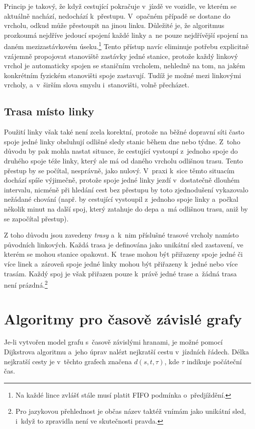 Princip je takový, že když cestující pokračuje v~jízdě ve vozidle, ve kterém se aktuálně nachází, nedochází k~přestupu. V~opačném případě se dostane do  vrcholu, odkud může přestoupit na jinou linku. Důležité je, že algoritmus prozkoumá nejdříve jedoucí spojení každé linky a~ne pouze nejdřívější spojení na daném mezizastávkovém úseku.\footnote{Na každé lince zvlášť stále musí platit FIFO podmínka o~předjíždění.} Tento přístup navíc eliminuje potřebu explicitně vzájemně propojovat stanoviště zastávky jedné stanice, protože každý linkový vrchol je automaticky spojen se staničním vrcholem, nehledně na tom, na jakém konkrétním fyzickém stanovišti spoje zastavují. Tudíž je možné mezi linkovými vrcholy, a~v~širším slova smyslu i~stanovišti, volně přecházet. 

\subsection{Trasa místo linky}
Použití linky však také není zcela korektní, protože na běžné dopravní síti často spoje jedné linky obsluhují odlišné sledy stanic během dne nebo týdne. Z~toho důvodu by pak mohla nastat situace, že cestující vystoupí z~jednoho spoje do druhého spoje téže linky, který ale má od daného vrcholu odlišnou trasu. Tento přestup by se počítal, nesprávně, jako nulový. V~praxi k~sice těmto situacím dochází spíše výjimečně, protože spoje jedné linky jezdí v~dostatečně dlouhém intervalu, nicméně při hledání cest bez přestupu by toto zjednodušení vykazovalo nežádané chování (např. by cestující vystoupil z~jednoho spoje linky a~počkal několik minut na další spoj, který zatahuje do depa a~má odlišnou trasu, aniž by se započítal přestup).

Z toho důvodu jsou zavedeny \textit{trasy} a~k~nim příslušné trasové vrcholy namísto původních linkových. Každá trasa je definována jako unikátní sled zastavení, ve kterém se mohou stanice opakovat. K~trase mohou být přiřazeny spoje jedné či více linek a~zároveň spoje jedné linky mohou být přiřazeny k~jedné nebo více trasám. Každý spoj je však přiřazen pouze k~právě jedné trase a~žádná trasa není prázdná.\footnote{Pro jazykovou přehlednost je občas název  taktéž vnímám jako unikátní sled, i~když to zpravidla není ve skutečnosti pravda.}

\section{Algoritmy pro časově závislé grafy}
Je-li vytvořen model grafu s~časově závislými hranami, je možné pomocí Dijkstrova algoritmu a~jeho úprav nalézt nejkratší cestu v~jízdních řádech. Délka nejkratší cesty je v~těchto grafech značena \(d(s,t,\tau)\), kde \(\tau\) indikuje počáteční čas. 

